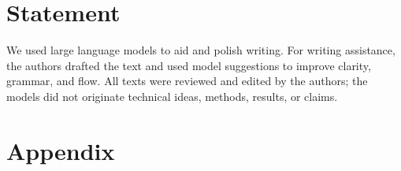 \documentclass{article} %
\begin{document}




\section*{Statement}
We used large language models to aid and polish writing. For writing assistance, the authors drafted the text and used model suggestions to improve clarity, grammar, and
flow. All texts were reviewed and edited by the authors; the models did not originate technical ideas,
methods, results, or claims.






\appendix
\section{Appendix}

\end{document}
